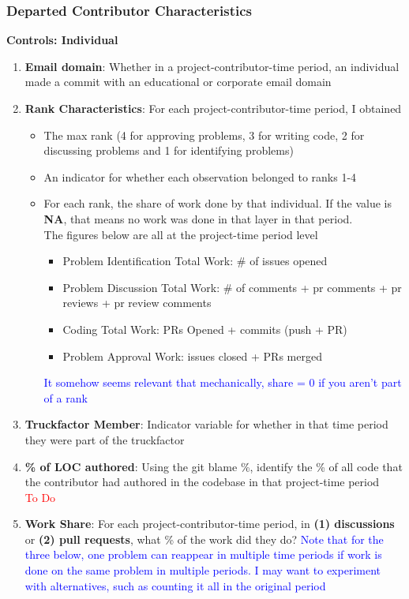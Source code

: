 \documentclass[source/paper/main.tex]{subfiles}
\begin{document}
\subsubsection{Departed Contributor Characteristics}
\textbf{Controls: Individual}
\begin{enumerate}
    \item \textbf{Email domain}: Whether in a project-contributor-time period, an individual made a commit with an educational or corporate email domain
    \item \textbf{Rank Characteristics}: For each project-contributor-time period, I obtained
    \begin{itemize}
        \item The max rank (4 for approving problems, 3 for writing code, 2 for discussing problems and 1 for identifying problems)
        \item An indicator for whether each observation belonged to ranks 1-4
        \item For each rank, the share of work done by that individual. If the value is \textbf{NA}, that means no work was done in that layer in that period. \\
        The figures below are all at the project-time period level
        \begin{itemize}
            \item Problem Identification Total Work: \# of issues opened
            \item Problem Discussion Total Work: \# of comments + pr comments + pr reviews + pr review comments 
            \item Coding Total Work: PRs Opened + commits (push + PR)
            \item Problem Approval Work: issues closed + PRs merged
        \end{itemize}
        \textcolor{blue}{It somehow seems relevant that mechanically, share = 0 if you aren't part of a rank}
    \end{itemize}
    \item \textbf{Truckfactor Member}: Indicator variable for whether in that time period they were part of the truckfactor
    \item \textbf{\% of LOC authored}: Using the git blame \%, identify the \% of all code that the contributor had authored in the codebase in that project-time period\\ \textcolor{red}{To Do}
    \item \textbf{Work Share}: For each project-contributor-time period, in \textbf{(1) discussions} or \textbf{(2) pull requests}, what \% of the work did they do? \textcolor{blue}{Note that for the three below, one problem can reappear in multiple time periods if work is done on the same problem in multiple periods. I may want to experiment with alternatives, such as counting it all in the original period}

\end{enumerate}
\end{document}

